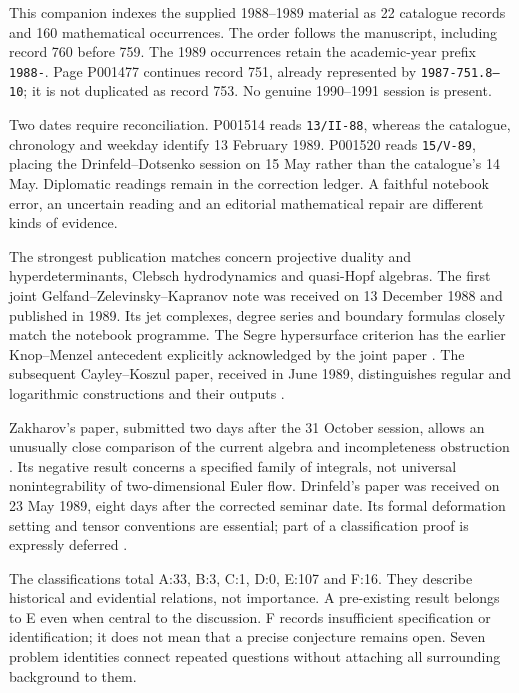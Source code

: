 \noindent This companion indexes the supplied 1988--1989 material as
22 catalogue records and 160 mathematical occurrences. The order follows
the manuscript, including record 760 before 759. The 1989 occurrences
retain the academic-year prefix \texttt{1988-}. Page P001477 continues
record 751, already represented by \texttt{1987-751.8--10}; it is not
duplicated as record 753. No genuine 1990--1991 session is present.

Two dates require reconciliation. P001514 reads \texttt{13/II-88},
whereas the catalogue, chronology and weekday identify 13 February 1989.
P001520 reads \texttt{15/V-89}, placing the Drinfeld--Dotsenko session
on 15 May rather than the catalogue's 14 May. Diplomatic readings remain
in the correction ledger. A faithful notebook error, an uncertain reading
and an editorial mathematical repair are different kinds of evidence.

The strongest publication matches concern projective duality and
hyperdeterminants, Clebsch hydrodynamics and quasi-Hopf algebras.
The first joint Gelfand--Zelevinsky--Kapranov note was received on
13 December 1988 and published in 1989. Its jet complexes, degree series
and boundary formulas closely match the notebook programme. The Segre
hypersurface criterion has the earlier Knop--Menzel antecedent explicitly
acknowledged by the joint paper
\citep[section 6]{gelfandzelevinskykapranov1989dual,knopmenzel1987duale}.
The subsequent Cayley--Koszul paper, received in June 1989, distinguishes
regular and logarithmic constructions and their outputs
\citep{gelfandzelevinskykapranov1989cayley}.

Zakharov's paper, submitted two days after the 31 October session,
allows an unusually close comparison of the current algebra and
incompleteness obstruction
\citep[sections 2--3, 5--6]{zakharov1989clebsch}. Its negative result
concerns a specified family of integrals, not universal nonintegrability
of two-dimensional Euler flow. Drinfeld's paper was received on
23 May 1989, eight days after the corrected seminar date. Its formal
deformation setting and tensor conventions are essential; part of a
classification proof is expressly deferred
\citep[section 1 and Theorem 3.15]{drinfeld1989quasi}.

The classifications total A:33, B:3, C:1, D:0, E:107 and F:16.
They describe historical and evidential relations, not importance.
A pre-existing result belongs to E even when central to the discussion.
F records insufficient specification or identification; it does not mean
that a precise conjecture remains open. Seven problem identities connect
repeated questions without attaching all surrounding background to them.

